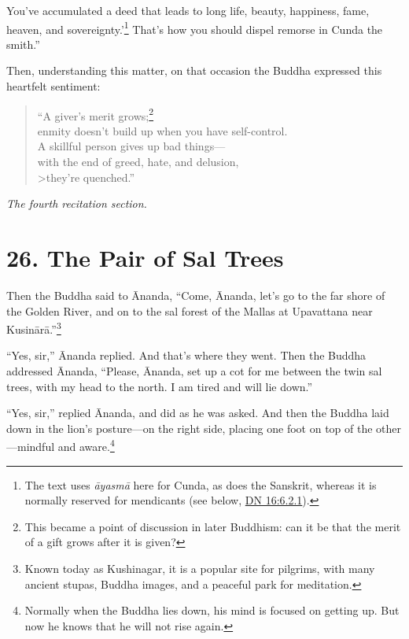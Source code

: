\documentclass[12pt,openany]{book}%
\newcommand*{\scendsection}[1]{\begin{Center}\begin{small}\textit{#1}\end{small}\end{Center}\addvspace{1em}}
\begin{document}
You’ve accumulated a deed that leads to long life, beauty, happiness, fame, heaven, and sovereignty.’\footnote{The text uses \textit{\textsanskrit{āyasmā}} here for Cunda, as does the Sanskrit, whereas it is normally reserved for mendicants (see below, \href{https://suttacentral.net/dn16/en/sujato\#6.2.1}{DN 16:6.2.1}). } That’s how you should dispel remorse in Cunda the smith.” 

Then, understanding this matter, on that occasion the Buddha expressed this heartfelt sentiment: 

\begin{verse}%
“A giver’s merit grows;\footnote{This became a point of discussion in later Buddhism: can it be that the merit of a gift grows after it is given? } \\
enmity doesn’t build up when you have self-control. \\
A skillful person gives up bad things—\\
with the end of greed, hate, and delusion, \\>they’re quenched.” 

%
\end{verse}

\scendsection{The fourth recitation section. }

\section*{26. The Pair of Sal Trees }

Then the Buddha said to Ānanda, “Come, Ānanda, let’s go to the far shore of the Golden River, and on to the sal forest of the Mallas at Upavattana near \textsanskrit{Kusinārā}.”\footnote{Known today as Kushinagar, it is a popular site for pilgrims, with many ancient stupas, Buddha images, and a peaceful park for meditation. } 

“Yes, sir,” Ānanda replied. And that’s where they went. Then the Buddha addressed Ānanda, “Please, Ānanda, set up a cot for me between the twin sal trees, with my head to the north. I am tired and will lie down.” 

“Yes, sir,” replied Ānanda, and did as he was asked. And then the Buddha laid down in the lion’s posture—on the right side, placing one foot on top of the other—mindful and aware.\footnote{Normally when the Buddha lies down, his mind is focused on getting up. But now he knows that he will not rise again. } 
\end{document}
